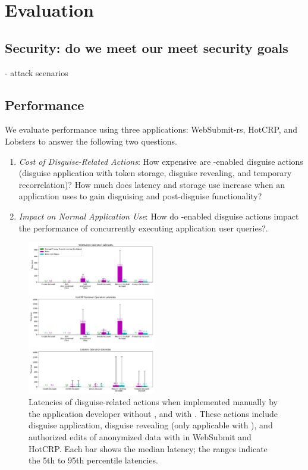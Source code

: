 \section{Evaluation}
\subsection{Security: do we meet our meet security goals}
   - attack scenarios

\subsection{Performance}

We evaluate performance using three applications: WebSubmit-rs, HotCRP, and Lobsters to answer the
following two questions.
\begin{enumerate}
    \item \emph{Cost of Disguise-Related Actions}: How expensive are \sys-enabled disguise actions
(disguise application with token storage, disguise revealing, and temporary recorrelation)?
How much does latency and storage use increase when an application uses \sys
to gain disguising and post-disguise functionality?
\item \emph{Impact on Normal Application Use}: How do \sys-enabled disguise actions impact the performance of concurrently executing
application user queries?.
\end{enumerate}

\begin{figure}[h!]
    \centering
        \includegraphics[width=0.5\textwidth]{figs/client_op_stats}
    \caption{Latencies of disguise-related actions when implemented manually by the application
    developer without \sys, and with \sys.
    These actions include disguise application, disguise revealing (only applicable with \sys), and
    authorized edits of anonymized data with \sys in WebSubmit and HotCRP.
    Each bar shows the median latency; the ranges indicate the 5th to 95th percentile latencies.
    } 
    \label{fig:client_opstats}
\end{figure}

